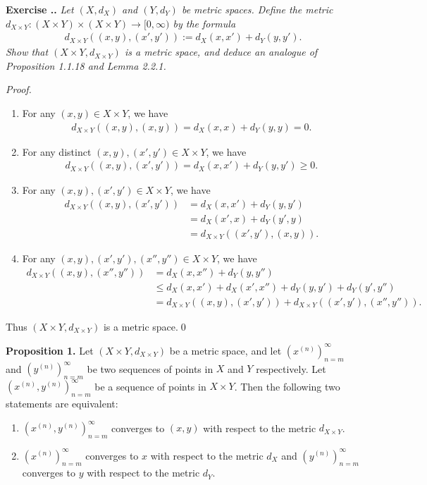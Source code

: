 \documentclass{book}
\newcommand{\pff}{\vspace{.25em}\noindent\emph{Proof.}~~}
\newcommand{\titl}[1]{\noindent\textbf{#1}}
\newcounter{Exercise}[section]
\renewcommand{\theExercise}{\thesection.\arabic{Exercise}.}
\newcommand{\new}{\vspace{1.5em}\noindent\textbf{Exercise \stepcounter{Exercise}\textbf{\theExercise}} }
\begin{document}
\new\emph{Let $(X,d_X)$ and $(Y,d_Y)$ be metric spaces. Define the metric $d_{X\times Y}:(X\times Y)\times(X\times Y)\to[0,\infty)$ by the formula}
    \begin{align*}
        d_{X\times Y}((x,y),(x',y')):=d_X(x,x')+d_Y(y,y').
    \end{align*}
\emph{Show that $(X\times Y, d_{X\times Y})$ is a metric space, and deduce an analogue of Proposition 1.1.18 and Lemma 2.2.1.}

\pff
\begin{enumerate}
    \item For any $(x,y)\in X\times Y$, we have
        \begin{align*}
            d_{X\times Y}((x,y),(x,y))=d_X(x,x)+d_Y(y,y)=0.
        \end{align*}
    \item For any distinct $(x,y),(x',y')\in X\times Y$, we have
        \begin{align*}
            d_{X\times Y}((x,y),(x',y'))=d_X(x,x')+d_Y(y,y')\geq 0.
        \end{align*}
    \item For any $(x,y),(x',y')\in X\times Y$, we have
        \begin{align*}
            d_{X\times Y}((x,y),(x',y'))&=d_X(x,x')+d_Y(y,y')\\
            &=d_X(x',x)+d_Y(y',y)\\
            &=d_{X\times Y}((x',y'),(x,y)).
        \end{align*}
    \item For any $(x,y),(x',y'),(x'',y'')\in X\times Y$, we have
        \begin{align*}
            d_{X\times Y}((x,y),(x'',y''))&=d_X(x,x'')+d_Y(y,y'')\\
            &\leq d_X(x,x')+d_X(x',x'')+d_Y(y,y')+d_Y(y',y'')\\
            &=d_{X\times Y}((x,y),(x',y'))+d_{X\times Y}((x',y'),(x'',y'')).
        \end{align*}
\end{enumerate}
Thus $(X\times Y,d_{X\times Y})$ is a metric space.\qed

\begin{framed}
\titl{Proposition 1.} Let $(X\times Y, d_{X\times Y})$ be a metric space, and let $(x^{(n)})_{n=m}^{\infty}$ and $(y^{(n)})_{n=m}^{\infty}$ be two sequences of points in $X$ and $Y$ respectively. Let $(x^{(n)},y^{(n)})_{n=m}^{\infty}$ be a sequence of points in $X\times Y$. Then the following two statements are equivalent:
\begin{enumerate}
    \item $(x^{(n)},y^{(n)})_{n=m}^{\infty}$ converges to $(x,y)$ with respect to the metric $d_{X\times Y}$.
    \item $(x^{(n)})_{n=m}^{\infty}$ converges to $x$ with respect to the metric $d_X$ and $(y^{(n)})_{n=m}^{\infty}$ converges to $y$ with respect to the metric $d_Y$.
\end{enumerate}
\end{framed}
\end{document}
